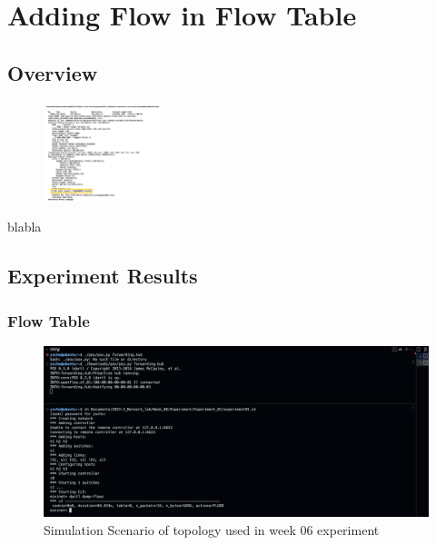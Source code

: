 \section{Adding Flow in Flow Table}

\subsection{Overview}
\begin{figure} \vspace{-20pt}
\begin{center}
\includegraphics[width=0.3\textwidth]{image/result_week01/Q1-2.jpg}    
\end{center}
\end{figure}
blabla

\subsection{Experiment Results}
\subsubsection{Flow Table}
\begin{figure}[!h]\centering 
	\includegraphics[width=.99\textwidth]{image/week06/2-1.png}
	\caption{\footnotesize 
	Simulation Scenario of topology used in week 06 experiment}
	\vspace{-10pt}
\end{figure}

